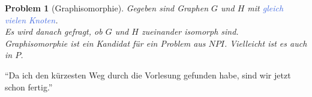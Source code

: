 \documentclass[11pt]{scrartcl}
\newcommand{\tcol}[1]{\textcolor{RoyalBlue}{#1}}
\theoremstyle{break}
\newtheorem{prob}[satz]{Problem}
\begin{document}
    \begin{prob}[Graphisomorphie]
        Gegeben sind Graphen $G$ und $H$ mit \tcol{gleich vielen Knoten}.\\
        Es wird danach gefragt, ob $G$ und $H$ zueinander isomorph sind.\\
        Graphisomorphie ist ein Kandidat für ein Problem aus $NPI$.
        Vielleicht ist es auch in $P$.
    \end{prob}

    \newpage
    \enquote{Da ich den kürzesten Weg durch die Vorlesung gefunden habe, sind wir jetzt schon fertig.}

    \printindex
\end{document}
